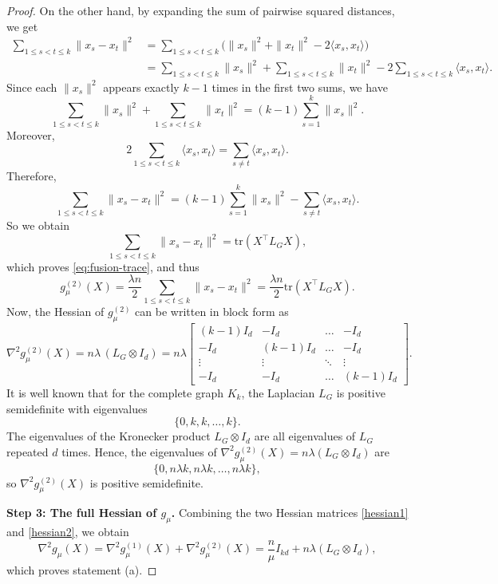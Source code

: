 \documentclass[11pt]{article}
\theoremstyle{definition}
\newcommand{\1}{\mathbf{1}}
\begin{document}
\begin{proof}
On the other hand, by expanding the sum of pairwise squared distances, we get 
\begin{align*}
\sum_{1\le s<t\le k} \|x_s - x_t\|^2
&= \sum_{1\le s<t\le k} \big(\|x_s\|^2 + \|x_t\|^2 - 2\langle x_s, x_t\rangle\big) \\
&= \sum_{1\le s<t\le k} \|x_s\|^2 + \sum_{1\le s<t\le k} \|x_t\|^2 - 2\sum_{1\le s<t\le k} \langle x_s, x_t\rangle.
\end{align*}
Since each $\|x_s\|^2$ appears exactly $k-1$ times in the first two sums, we have
\[
\sum_{1\le s<t\le k} \|x_s\|^2 + \sum_{1\le s<t\le k} \|x_t\|^2
= (k-1)\sum_{s=1}^k\|x_s\|^2.
\]
Moreover,
\[
2\sum_{1\le s<t\le k} \langle x_s, x_t\rangle
= \sum_{s\neq t} \langle x_s, x_t\rangle.
\]
Therefore,
\[
\sum_{1\le s<t\le k} \|x_s - x_t\|^2
= (k-1)\sum_{s=1}^k\|x_s\|^2 - \sum_{s\neq t}\langle x_s, x_t\rangle.
\]
So we obtain
\[
\sum_{1\le s<t\le k} \|x_s - x_t\|^2 = \mathrm{tr}(X^\top L_G X),
\]
which proves \eqref{eq:fusion-trace}, and thus
\[
g_\mu^{(2)}(X) = \frac{\lambda n}{2} \sum_{1\le s<t\le k} \|x_s - x_t\|^2
= \frac{\lambda n}{2} \mathrm{tr}(X^\top L_G X).
\]
Now, the Hessian of $g_\mu^{(2)}$ can be written in block form as
\begin{equation}\label{hessian2}
\nabla^2 g_\mu^{(2)}(X)
= n\lambda \,(L_G \otimes I_d)
= n\lambda
\begin{bmatrix}
(k-1)I_d & -I_d & \dots & -I_d \\
-I_d & (k-1)I_d & \dots & -I_d \\
\vdots & \vdots & \ddots & \vdots \\
-I_d & -I_d & \dots & (k-1)I_d
\end{bmatrix}.
\end{equation}
It is well known that for the complete graph $K_k$, the Laplacian $L_G$ is positive semidefinite with eigenvalues
\[
\{0, k, k, \dots, k\}.
\]
The eigenvalues of the Kronecker product $L_G \otimes I_d$ are all eigenvalues of $L_G$ repeated $d$ times. Hence, the eigenvalues of $\nabla^2 g_\mu^{(2)}(X) = n\lambda (L_G \otimes I_d)$ are
\[
\{0, n\lambda k, n\lambda k, \dots, n\lambda k\},
\]
so $\nabla^2 g_\mu^{(2)}(X)$ is positive semidefinite.

\medskip
\noindent\textbf{Step 3: The full Hessian of $g_\mu$.}
Combining the two Hessian matrices \eqref{hessian1} and \eqref{hessian2}, we obtain
\begin{equation}\label{gmustrong}
\nabla^2 g_\mu(X)
= \nabla^2 g_\mu^{(1)}(X) + \nabla^2 g_\mu^{(2)}(X)
= \frac{n}{\mu} I_{kd} + n\lambda (L_G \otimes I_d),    
\end{equation}
which proves statement (a).


\end{proof}
\end{document}
